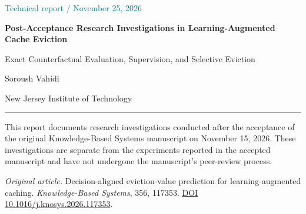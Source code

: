 \documentclass[11pt,letterpaper]{article}
\newcommand{\boundarynotice}{This report documents research investigations conducted after the acceptance of the original Knowledge-Based Systems manuscript on November 15, 2026. These investigations are separate from the experiments reported in the accepted manuscript and have not undergone the manuscript\textquoteright s peer-review process.}
\begin{document}
\hypersetup{pageanchor=false}
\begin{titlepage}
\thispagestyle{empty}
\raggedright
\vspace*{0.72in}
{\large\textcolor{teal}{Technical report \quad / \quad November 25, 2026}\par}
\vspace{0.35in}
{\color{ink}\Huge\bfseries Post-Acceptance Research Investigations in Learning-Augmented Cache Eviction\par}
\vspace{0.25in}
{\color{teal}\LARGE Exact Counterfactual Evaluation, Supervision, and Selective Eviction\par}
\vspace{0.53in}
{\Large Soroush Vahidi\par}
{New Jersey Institute of Technology\par}
\vfill
\rule{\textwidth}{0.45pt}
\vspace{0.14in}

\boundarynotice

\vspace{0.12in}
\textit{Original article.} Decision-aligned eviction-value prediction for learning-augmented caching. \textit{Knowledge-Based Systems}, 356, 117353. \href{https://doi.org/10.1016/j.knosys.2026.117353}{DOI 10.1016/j.knosys.2026.117353}.
\end{titlepage}
\hypersetup{pageanchor=true}

\begin{abstract}
Finite-horizon eviction supervision can leave most cache residents tied while still producing expensive and harmful online policies. This report consolidates completed experiments on causal eviction features, stateless and recurrent learners, and selective departures from least recently used (LRU) replacement. For unit-size fully associative paging, a virtual capacity-\(C+1\) LRU stack evaluates every forced victim under deterministic LRU continuation in expected \(O(C+H)\) time for a suffix of \(H\) requests and \(O(C)\) auxiliary space. A single alternative costs at most one additional miss relative to the LRU victim and at least \(\max(1,C-H)\) actions are optimal. The strongest controlled histogram-boosting finalist saved 3,730 of 565,126 LRU misses (0.660\%) on 840,000 retrospective scored requests at 18.35 times LRU CPU cost. No finalist satisfied the complete advancement screen. Independent confirmation stayed sealed.
\end{abstract}
\end{document}
